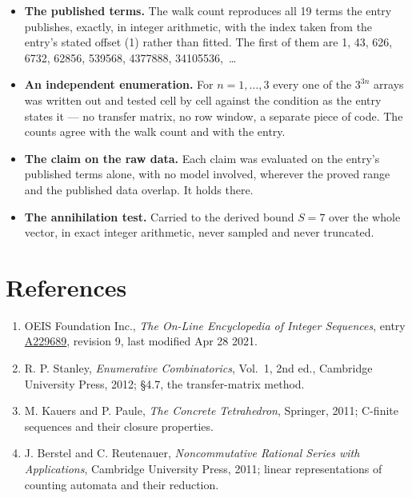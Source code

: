 \documentclass[11pt]{article}
\theoremstyle{definition}
\begin{document}
\begin{itemize}

\item {\bfseries The published terms.} The walk count reproduces all 19 terms the entry publishes, exactly, in integer arithmetic, with the index taken from the entry's stated offset (1) rather than fitted. The first of them are 1, 43, 626, 6732, 62856, 539568, 4377888, 34105536,~\dots

\item {\bfseries An independent enumeration.} For $n = 1,\dots,3$ every one of the $3^{3n}$ arrays was written out and tested cell by cell against the condition as the entry states it --- no transfer matrix, no row window, a separate piece of code. The counts agree with the walk count and with the entry.

\item {\bfseries The claim on the raw data.} Each claim was evaluated on the entry's published terms alone, with no model involved, wherever the proved range and the published data overlap. It holds there.

\item {\bfseries The annihilation test.} Carried to the derived bound $S = 7$ over the whole vector, in exact integer arithmetic, never sampled and never truncated.

\end{itemize}

\section{References}

\begin{enumerate}

\item OEIS Foundation Inc., \emph{The On-Line Encyclopedia of Integer Sequences}, entry \href{https://oeis.org/A229689}{A229689}, revision 9, last modified Apr 28 2021.

\item R. P. Stanley, \emph{Enumerative Combinatorics}, Vol.~1, 2nd ed., Cambridge University Press, 2012; \S4.7, the transfer-matrix method.

\item M. Kauers and P. Paule, \emph{The Concrete Tetrahedron}, Springer, 2011; C-finite sequences and their closure properties.

\item J. Berstel and C. Reutenauer, \emph{Noncommutative Rational Series with Applications}, Cambridge University Press, 2011; linear representations of counting automata and their reduction.

\end{enumerate}
\end{document}
